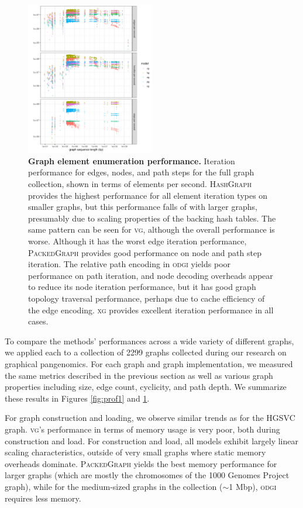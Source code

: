 \documentclass{bioinfo}
\begin{document}
\begin{figure}
  \centering
  \includegraphics[width=0.5\textwidth]{figures/iteration_per_second.png}
  \caption{
    \label{fig:prof2}
    \textbf{Graph element enumeration performance.}
    Iteration performance for edges, nodes, and path steps for the full graph collection, shown in terms of elements per second.
    \textsc{HashGraph} provides the highest performance for all element iteration types on smaller graphs, but this performance falls of with larger graphs, presumably due to scaling properties of the backing hash tables.
    The same pattern can be seen for \textsc{vg}, although the overall performance is worse.
    Although it has the worst edge iteration performance, \textsc{PackedGraph} provides good performance on node and path step iteration.
    The relative path encoding in \textsc{odgi} yields poor performance on path iteration, and node decoding overheads appear to reduce its node iteration performance, but it has good graph topology traversal performance, perhaps due to cache efficiency of the edge encoding.
    \textsc{xg} provides excellent iteration performance in all cases.
    }
\end{figure}

To compare the methods' performances across a wide variety of different graphs, we applied each to a collection of 2299 graphs collected during our research on graphical pangenomics.
For each graph and graph implementation, we measured the same metrics described in the previous section as well as various graph properties including size, edge count, cyclicity, and path depth.
We summarize these results in Figures \ref{fig:prof1} and \ref{fig:prof2}.

For graph construction and loading, we observe similar trends as for the HGSVC graph.
\textsc{vg}'s performance in terms of memory usage is very poor, both during construction and load.
For construction and load, all models exhibit largely linear scaling characteristics, outside of very small graphs where static memory overheads dominate.
\textsc{PackedGraph} yields the best memory performance for larger graphs (which are mostly the chromosomes of the 1000 Genomes Project graph), while for the medium-sized graphs in the collection ($\sim$1 Mbp), \textsc{odgi} requires less memory.
\end{document}
